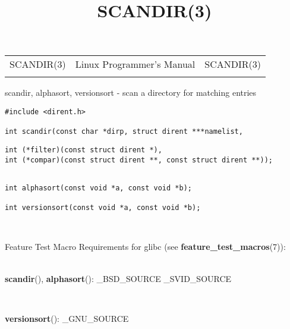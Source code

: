 \documentclass[]{article}
\title{SCANDIR(3)}
\author{}
\date{}
\let\realtextbf=\textbf
\renewcommand{\textbf}[1]{\textcolor{boldcolor}{\realtextbf{#1}}}
\begin{document}
\maketitle

\begin{longtable}[c]{@{}lll@{}}
\toprule\addlinespace
SCANDIR(3) & Linux Programmer's Manual & SCANDIR(3)
\\\addlinespace
\bottomrule
\end{longtable}


scandir, alphasort, versionsort - scan a directory for matching entries


\begin{verbatim}
#include <dirent.h>
 
int scandir(const char *dirp, struct dirent ***namelist,
\end{verbatim}

\begin{verbatim}
int (*filter)(const struct dirent *),
int (*compar)(const struct dirent **, const struct dirent **));
\end{verbatim}

\begin{verbatim}
 
int alphasort(const void *a, const void *b);
 
int versionsort(const void *a, const void *b);
\end{verbatim}

~

Feature Test Macro Requirements for glibc (see
\textbf{feature\_test\_macros}(7)): \\

~

\textbf{scandir}(), \textbf{alphasort}(): \_BSD\_SOURCE
\textbar{}\textbar{} \_SVID\_SOURCE

~

\textbf{versionsort}(): \_GNU\_SOURCE

\end{document}
